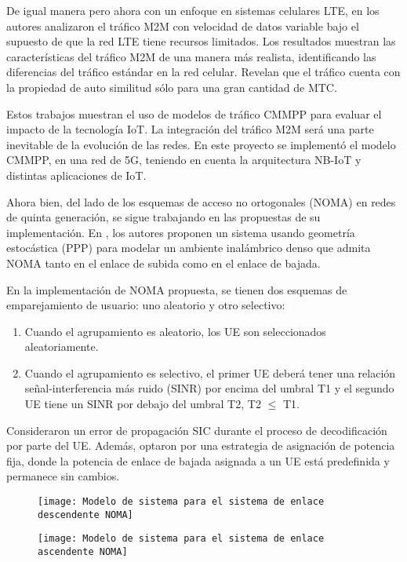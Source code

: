 De igual manera pero ahora con un enfoque en sistemas celulares LTE, en \parencite{Smiljkovic2014} los autores analizaron el tráfico M2M con velocidad de datos variable bajo el supuesto de que la red LTE tiene recursos limitados. Los resultados muestran las características del tráfico M2M de una manera más realista, identificando las diferencias del tráfico estándar en la red celular. Revelan que el tráfico cuenta con la propiedad de auto similitud sólo para una gran cantidad de MTC.\newline

Estos trabajos muestran el uso de modelos de tráfico CMMPP para evaluar el impacto de la tecnología IoT. La integración del tráfico M2M será una parte inevitable de la evolución de las redes. En este proyecto se implementó el modelo CMMPP, en una red de 5G, teniendo en cuenta la arquitectura NB-IoT y distintas aplicaciones de IoT.\newline

Ahora bien, del lado de los esquemas de acceso no ortogonales (NOMA) en redes de quinta generación, se sigue trabajando en las propuestas de su implementación. En \parencite{Zhang2017}, los autores proponen un sistema usando geometría estocástica (PPP) para modelar un ambiente inalámbrico denso que admita NOMA tanto en el enlace de subida como en el enlace de bajada. \newline

En la implementación de NOMA propuesta, se tienen dos esquemas de emparejamiento de usuario: uno aleatorio y otro selectivo:
\begin{enumerate}
\item  Cuando el agrupamiento es aleatorio, los UE son seleccionados aleatoriamente.
\item  Cuando el agrupamiento es selectivo, el primer UE deberá tener una relación señal-interferencia más ruido (SINR) por encima del umbral T1 y el segundo UE tiene un SINR por debajo del umbral T2, T2 $\mathrm{\le}$ T1.
\end{enumerate}

Consideraron un error de propagación SIC durante el proceso de decodificación por parte del UE. Además, optaron por una estrategia de asignación de potencia fija, donde la potencia de enlace de bajada asignada a un UE está predefinida y permanece sin cambios.\newline

\begin{figure}
\centering
\begin{minipage}{.45\linewidth}
  \texttt{[image: Modelo de sistema para el sistema de enlace descendente NOMA]}
  \label{fig:img1}
\end{minipage}
\hspace{.05\linewidth}
\begin{minipage}{.45\linewidth}
  \texttt{[image: Modelo de sistema para el sistema de enlace ascendente NOMA]}
  \label{fig:img2}
\end{minipage}
\end{figure}

